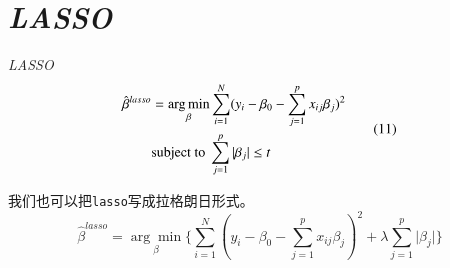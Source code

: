 \documentclass[
  15pt,
  ignorenonframetext,
]{beamer}
\begin{document}
\hypertarget{lasso}{%
\section{\texorpdfstring{\emph{LASSO}}{LASSO}}\label{lasso}}

\begin{frame}[fragile]{\emph{LASSO}}
\[
\begin{align}
\hat{\beta}^{lasso}&=\underset{\beta}{\arg\min}\sum\limits_{i=1}^N(y_i-\beta_0-\sum\limits_{j=1}^px_{ij}\beta_j)^2\notag\\
&\text{subject to }\sum\limits_{j=1}^p\vert\beta_j\vert\le t 
\end{align}
\tag{11}
\]

我们也可以把\texttt{lasso}写成拉格朗日形式。 \[
\hat{\beta}^{lasso}=\underset{\beta}{\arg\min}\Big\{\sum\limits_{i=1}^N(y_i-\beta_0-\sum\limits_{j=1}^px_{ij}\beta_j)^2+\lambda\sum\limits_{j=1}^p\vert\beta_j\vert\Big\}\tag{3.52}\label{3.52}
\]
\end{frame}
\end{document}
